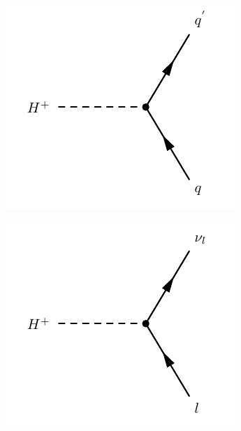 \begin{figure}[!h]
\begin{subfigure}{0.33\textwidth}
   \includegraphics[width=\textwidth]{figures/chargedHq2.pdf}
\end{subfigure} %
\begin{subfigure}{0.33\textwidth}
   \includegraphics[width=\textwidth]{figures/chargedHlep.pdf}
\end{subfigure}%

\end{figure}
